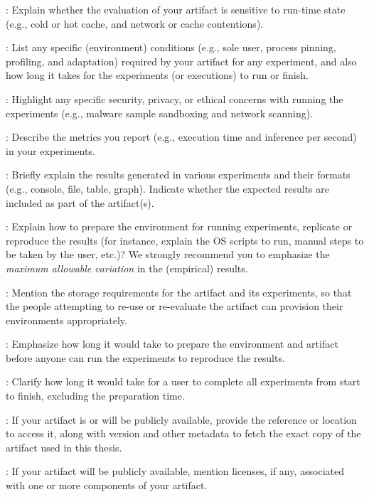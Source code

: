 :
%
Explain whether the evaluation of your artifact is sensitive to run-time state
(e.g., cold or hot cache, and network or cache contentions).

:
%
List any specific (environment) conditions (e.g., sole user, process pinning,
profiling, and adaptation) required by your artifact for any experiment, and
also how long it takes for the experiments (or executions) to run or finish.

:
%
Highlight any specific security, privacy, or ethical concerns with running the
experiments (e.g., malware sample sandboxing and network scanning).

:
%
Describe the metrics you report (e.g., execution time and inference per second)
in your experiments.

:
%
Briefly explain the results generated in various experiments and their formats
(e.g., console, file, table, graph).
%
Indicate whether the expected results are included as part of the artifact(s).

:
%
Explain how to prepare the environment for running experiments, replicate or
reproduce the results (for instance, explain the OS scripts to run, manual steps
to be taken by the user, etc.)?
%
We strongly recommend you to emphasize the \textit{maximum allowable variation}
in the (empirical) results.

:
%
Mention the storage requirements for the artifact and its experiments, so that
the people attempting to re-use or re-evaluate the artifact can provision their
environments appropriately.

:
%
Emphasize how long it would take to prepare the environment and artifact before
anyone can run the experiments to reproduce the results.

:
%
Clarify how long it would take for a user to complete all experiments from start
to finish, excluding the preparation time.

:
%
If your artifact is or will be publicly available, provide the reference or
location to access it, along with version and other metadata to fetch the exact
copy of the artifact used in this thesis.

:
%
If your artifact will be publicly available, mention licenses, if any,
associated with one or more components of your artifact.

